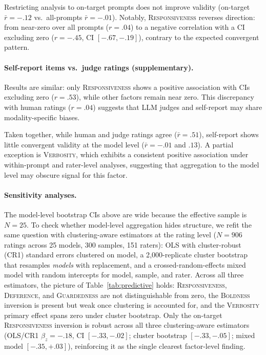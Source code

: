 \documentclass[11pt]{article}
\newcommand{\factorname}[1]{\textsc{#1}}
\begin{document}
Restricting analysis to on-target prompts does not improve validity (on-target $\bar{r} = -.12$ vs.\ all-prompts $\bar{r} = -.01$). Notably, \factorname{Responsiveness} reverses direction: from near-zero over all prompts ($r = .04$) to a negative correlation with a CI excluding zero ($r = -.45$, CI $[-.67, -.19]$), contrary to the expected convergent pattern.

\paragraph{Self-report items vs.\ judge ratings (supplementary).}
Results are similar: only \factorname{Responsiveness} shows a positive association with CIs excluding zero ($r = .53$), while other factors remain near zero. This discrepancy with human ratings ($r = .04$) suggests that LLM judges and self-report may share modality-specific biases.

Taken together, while human and judge ratings agree ($\bar{r} = .51$), self-report shows little convergent validity at the model level ($\bar{r} = -.01$ and $.13$). A partial exception is \factorname{Verbosity}, which exhibits a consistent positive association under within-prompt and rater-level analyses, suggesting that aggregation to the model level may obscure signal for this factor.

\paragraph{Sensitivity analyses.}
The model-level bootstrap CIs above are wide because the effective sample is $N = 25$.
To check whether model-level aggregation hides structure, we refit the same question with clustering-aware estimators at the rating level ($N = 906$ ratings across 25 models, 300 samples, 151 raters): OLS with cluster-robust (CR1) standard errors clustered on model, a 2{,}000-replicate cluster bootstrap that resamples \emph{models} with replacement, and a crossed-random-effects mixed model with random intercepts for model, sample, and rater.
Across all three estimators, the picture of Table~\ref{tab:predictive} holds: \factorname{Responsiveness}, \factorname{Deference}, and \factorname{Guardedness} are not distinguishable from zero, the \factorname{Boldness} inversion is present but weak once clustering is accounted for, and the \factorname{Verbosity} primary effect spans zero under cluster bootstrap.
Only the on-target \factorname{Responsiveness} inversion is robust across all three clustering-aware estimators (OLS/CR1 $\beta_z = -.18$, CI $[-.33, -.02]$; cluster bootstrap $[-.33, -.05]$; mixed model $[-.35, +.03]$), reinforcing it as the single clearest factor-level finding.
\end{document}
